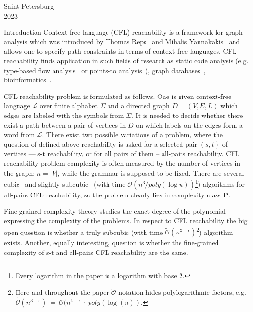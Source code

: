 \documentclass[12pt]{article}
\begin{document}
\vspace{2cm}
\begin{center}
	\normalsize
	Saint-Petersburg \\
	2023
\end{center}
\thispagestyle{empty}
\vfill\eject
      \par

\fontsize{12pt}{12pt}\selectfont
{}

\newpage

\tableofcontents

\newpage


\begin{section}{Introduction}
    Context-free language (CFL) reachability is a framework for graph analysis which was introduced by Thomas Reps~\cite{REPS1998701} and Mihalis Yannakakis~\cite{10.1145/298514.298576} and allows one to specify path constraints in terms of context-free languages. CFL reachability finds application in such fields of research as static code analysis (e.g. type-based flow analysis~\cite{10.1145/373243.360208} or points-to analysis~\cite{10.1145/1103845.1094817, 10.1145/1133255.1134027}), graph databases~\cite{10.1145/298514.298576}, bioinformatics~\cite{SubgraphQueriesbyContextfreeGrammars}.
	
	CFL reachability problem is formulated as follows. One is given context-free language $\mathcal{L}$ over finite alphabet $\Sigma$ and a directed graph $D=(V, E, L)$ which edges are labeled with the symbols from $\Sigma$. It is needed to decide whether there exist a path between a pair of vertices in $D$ on which labels on the edges form a word from $\mathcal{L}$. There exist two possible variations of a problem, where the question of defined above reachability is asked for a selected pair $(s, t)$ of vertices --- s-t reachability, or for all pairs of them -- all-pairs reachability. CFL reachability problem complexity is often measured by the number of vertices in the graph: $n = |V|$, while the grammar is supposed to be fixed. There are several cubic~\cite{10.1145/298514.298576, 10.1145/199448.199462} and slightly subcubic~\cite{10.1145/1328438.1328460} (with time $\mathcal{O}(n^{3} / poly(\log n))$\footnote{Every logarithm in the paper is a logarithm with base 2.}) algorithms for all-pairs CFL reachability, so the problem clearly lies in complexity class \textbf{P}. 
	
	Fine-grained complexity theory studies the exact degree of the polynomial expressing the complexity of the problems. In respect to CFL reachability the big open question is whether a truly subcubic (with time $\tilde{\mathcal{O}}(n^{3 - \epsilon})$\footnote{Here and throughout the paper $\tilde{\mathcal{O}}$ notation hides polylogarithmic factors,  e.g. $\tilde{\mathcal{O}}(n^{3 - \epsilon})~=~\mathcal{O}(n^{3 - \epsilon}~\cdot~poly(\log(n))$.}) algorithm exists. Another, equally interesting, question is whether the fine-grained complexity of s-t and all-pairs CFL reachability are the same.
	

\end{section}
\end{document}
